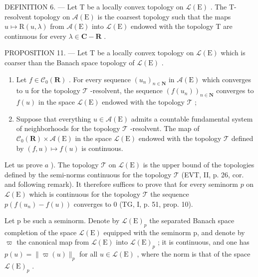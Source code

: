 DEFINITION 6. --- Let T be a locally convex topology on \(\mathcal{L}(\mathrm{E})\) . The T-resolvent topology on \(\mathcal{A}(\mathrm{E})\) is the coarsest topology such that the maps \(u \mapsto \mathrm{R}(u, \lambda)\) from \(\mathcal{A}(\mathrm{E})\) into \(\mathcal{L}(\mathrm{E})\) endowed with the topology T are continuous for every \(\lambda \in \mathbf{C} - \mathbf{R}\) .

PROPOSITION 11. --- Let T be a locally convex topology on \(\mathcal{L}(\mathrm{E})\) which is coarser than the Banach space topology of \(\mathcal{L}(\mathrm{E})\) .

\begin{enumerate}
\def\labelenumi{\alph{enumi})}
\item
  Let \(f \in \mathcal{C}_0(\mathbf{R})\) . For every sequence \((u_n)_{n \in \mathbf{N}}\) in \(\mathcal{A}(\mathrm{E})\) which converges to u for the topology \(\mathcal{T}\) -resolvent, the sequence \((f(u_n))_{n \in \mathbf{N}}\) converges to \(f(u)\) in the space \(\mathcal{L}(\mathrm{E})\) endowed with the topology \(\mathcal{T}\) ;
\item
  Suppose that everything \(u \in \mathcal{A}(\mathrm{E})\) admits a countable fundamental system of neighborhoods for the topology \(\mathcal{T}\) -resolvent. The map of \(\mathcal{C}_0(\mathbf{R}) \times \mathcal{A}(\mathrm{E})\) in the space \(\mathcal{L}(\mathrm{E})\) endowed with the topology \(\mathcal{T}\) defined by \((f, u) \mapsto f(u)\) is continuous.
\end{enumerate}

Let us prove \(a\) ). The topology \(\mathcal{T}\) on \(\mathcal{L}(\mathrm{E})\) is the upper bound of the topologies defined by the semi-norms continuous for the topology \(\mathcal{T}\) (EVT, II, p. 26, cor. and following remark). It therefore suffices to prove that for every seminorm \(p\) on \(\mathcal{L}(\mathrm{E})\) which is continuous for the topology \(\mathcal{T}\) the sequence \(p(f(u_n) - f(u))\) converges to 0 (TG, I, p. 51, prop. 10).

Let p be such a seminorm. Denote by \(\mathcal{L}(\mathrm{E})_{p}\) the separated Banach space completion of the space \(\mathcal{L}(\mathrm{E})\) equipped with the seminorm p, and denote by \(\varpi\) the canonical map from \(\mathcal{L}(\mathrm{E})\) into \(\mathcal{L}(\mathrm{E})_{p}\) ; it is continuous, and one has \(p(u) = \|\varpi(u)\|_{p}\) for all \(u \in \mathcal{L}(\mathrm{E})\) , where the norm is that of the space \(\mathcal{L}(\mathrm{E})_{p}\) .

